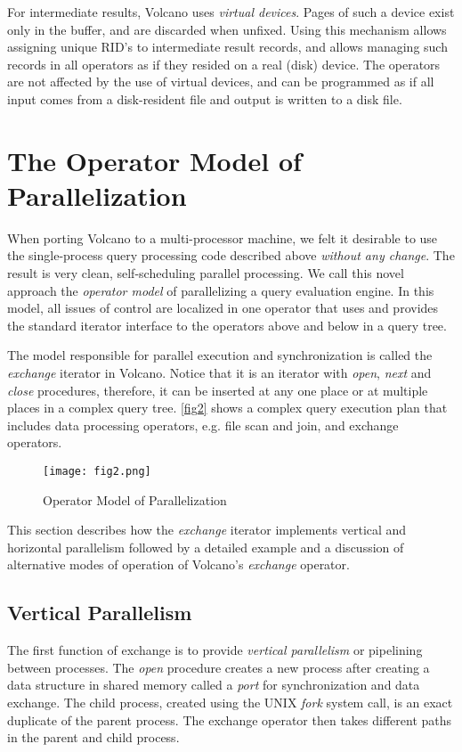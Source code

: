 \documentclass[a4paper,11pt,notitlepage,twoside,openright]{article}
\begin{document}
For intermediate results, Volcano uses \emph{virtual devices}.
Pages of such a device exist only in the buffer, and are
discarded when unfixed. Using this mechanism allows
assigning unique RID's to intermediate result records, and
allows managing such records in all operators as if they
resided on a real (disk) device. The operators are not
affected by the use of virtual devices, and can be programmed
as if all input comes from a disk-resident file and
output is written to a disk file.

\section{The Operator Model of Parallelization}

When porting Volcano to a multi-processor machine,
we felt it desirable to use the single-process query processing
code described above \emph{without any change}. The result is
very clean, self-scheduling parallel processing. We call this
novel approach the \emph{operator model} of parallelizing a query
evaluation engine. In this model, all issues of control are
localized in one operator that uses and provides the standard
iterator interface to the operators above and below in a
query tree.

The model responsible for parallel execution and
synchronization is called the \emph{exchange} iterator in Volcano.
Notice that it is an iterator with \emph{open}, \emph{next} and \emph{close}
procedures, therefore, it can be inserted at any one place or at
multiple places in a complex query tree. \autoref{fig2} shows a
complex query execution plan that includes data processing
operators, e.g. file scan and join, and exchange operators.

\begin{figure}
  \centering
  \texttt{[image: fig2.png]}
  \caption{Operator Model of Parallelization\label{fig2}}
\end{figure}

This section describes how the \emph{exchange} iterator
implements vertical and horizontal parallelism followed by a
detailed example and a discussion of alternative modes of
operation of Volcano's \emph{exchange} operator.

\subsection{Vertical Parallelism}

The first function of exchange is to provide \emph{vertical
parallelism} or pipelining between processes. The \emph{open}
procedure creates a new process after creating a data structure
in shared memory called a \emph{port} for synchronization and data
exchange. The child process, created using the UNIX \emph{fork}
system call, is an exact duplicate of the parent process.
The exchange operator then takes different paths in the
parent and child process.
\end{document}
